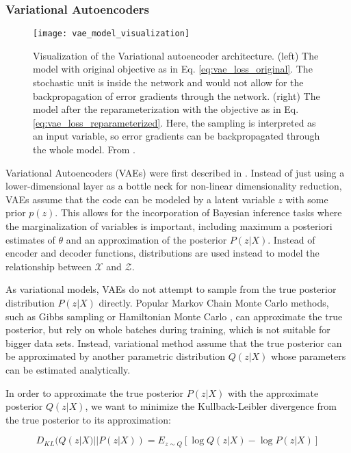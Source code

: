 \documentclass[6pt]{article}
\begin{document}
\subsubsection{Variational Autoencoders}
\label{Variational Autoencoders}
\begin{figure}[h!] %
   \centering
   \texttt{[image: vae\_model\_visualization]} 
   \caption{Visualization of the Variational autoencoder architecture. (left) The model with original objective as in Eq. \ref{eq:vae_loss_original}. The stochastic unit is inside the network and would not allow for the backpropagation of error gradients through the network. (right) The model after the reparameterization with the objective as in Eq. \ref{eq:vae_loss_reparameterized}. Here, the sampling is interpreted as an input variable, so error gradients can be backpropagated through the whole model. From \cite{doersch2016tutorial}.}
   \label{fig:vae_model_visualization}
\end{figure}

Variational Autoencoders (VAEs) were first described in \cite{kingma2013auto}. Instead of just using a lower-dimensional layer as a bottle neck for non-linear dimensionality reduction, VAEs assume that the code can be modeled by a latent variable $z$ with some prior $p(z)$. This allows for the incorporation of Bayesian inference tasks where the marginalization of variables is important, including maximum a posteriori estimates of $\theta$ and an approximation of the posterior $P(z|X)$. Instead of encoder and decoder functions, distributions are used instead to model the relationship between $\mathcal{X} $ and $  \mathcal{Z}$.

As variational models, VAEs do not attempt to sample from the true posterior distribution $P(z|X)$ directly. Popular Markov Chain Monte Carlo methods, such as Gibbs sampling \citep{geman1984stochastic} or Hamiltonian Monte Carlo \citep{duane1987hybrid}, can approximate the true posterior, but rely on whole batches during training, which is not suitable for bigger data sets. Instead, variational method assume that the true posterior can be approximated by another parametric distribution $Q(z|X)$ whose parameters can be estimated analytically. 

In order to approximate the true posterior  $P(z|X)$ with the approximate posterior $Q(z|X)$, we want to minimize the Kullback-Leibler divergence from the true posterior to its approximation: 

\begin{equation}
D_{KL}(Q(z|X)||P(z|X)) = E_{z\sim Q}[\log Q(z|X) - \log P(z|X)]
\end{equation}
\end{document}
